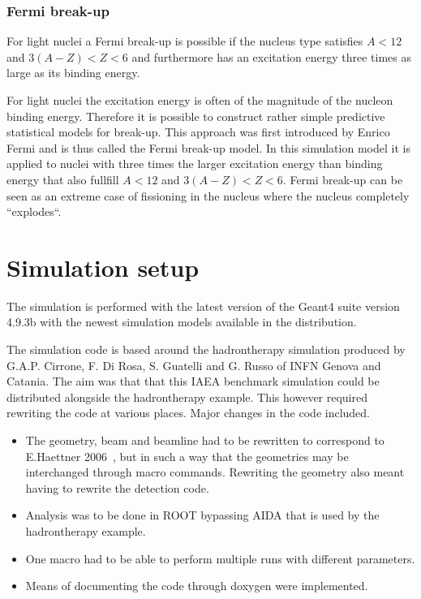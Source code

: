 \subsubsection{Fermi break-up}
For light nuclei a Fermi break-up is possible if the nucleus type satisfies $A < 12$ and $3(A - Z) < Z < 6$ and furthermore has an excitation energy three times as large as its binding energy.

For light nuclei the excitation energy is often of the magnitude of the nucleon binding energy. Therefore it is possible to construct rather simple predictive statistical models for break-up. This approach was first introduced by Enrico Fermi and is thus called the Fermi break-up model. In this simulation model it is applied to nuclei with three times the larger excitation energy than binding energy that also fullfill $A < 12$ and $3(A - Z) < Z < 6$. Fermi break-up can be seen as an extreme case of fissioning in the nucleus where the nucleus completely ``explodes``. %
\clearpage
\section{Simulation setup} %
The simulation is performed with the latest version of the Geant4 suite version 4.9.3b with the newest simulation models available in the distribution.

The simulation code is based around the hadrontherapy simulation produced by G.A.P. Cirrone, F. Di Rosa, S. Guatelli and  G. Russo of INFN Genova and Catania. The aim was that that this IAEA benchmark simulation could be distributed alongside the hadrontherapy example. This however required rewriting the code at various places. Major changes in the code included.
\begin{itemize}
\item The geometry, beam and beamline had to be rewritten to correspond to E.Haettner 2006~\cite{ehaettner}, but in such a way that the geometries may be interchanged through macro commands. Rewriting the geometry also meant having to rewrite the detection code.
\item Analysis was to be done in ROOT bypassing AIDA that is used by the hadrontherapy example.
\item One macro had to be able to perform multiple runs with different parameters.
\item Means of documenting the code through doxygen were implemented.
\end{itemize}


